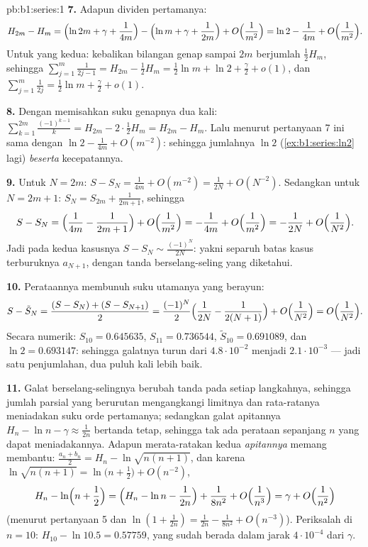 \begin{solution}{pb:b1:series:1}
\textbf{7.} Adapun dividen pertamanya:
\[
H_{2m} - H_m = \Bigl(\ln 2m + \gamma + \frac{1}{4m}\Bigr)
- \Bigl(\ln m + \gamma + \frac{1}{2m}\Bigr) +
O\Bigl(\frac{1}{m^2}\Bigr)
= \ln 2 - \frac{1}{4m} + O\Bigl(\frac{1}{m^2}\Bigr).
\]
Untuk yang kedua: kebalikan bilangan genap sampai $2m$ berjumlah $\frac12 H_m$, sehingga
$\sum_{j=1}^{m}\frac{1}{2j-1} = H_{2m} - \frac12 H_m = \frac12
\ln m + \ln 2 + \frac\gamma2 + o(1)$, dan $\sum_{j=1}^m
\frac{1}{2j} = \frac12\ln m + \frac\gamma2 + o(1)$.

\textbf{8.} Dengan memisahkan suku genapnya dua kali:
$\sum_{k=1}^{2m}\frac{(-1)^{k-1}}{k} = H_{2m} - 2\cdot\frac12
H_m = H_{2m} - H_m$. Lalu menurut pertanyaan 7 ini sama dengan $\ln 2 -
\frac{1}{4m} + O(m^{-2})$: sehingga jumlahnya $\ln 2$
(\cref{ex:b1:series:ln2} lagi) \emph{beserta} kecepatannya.

\textbf{9.} Untuk $N = 2m$: $S - S_N = \frac{1}{4m} + O(m^{-2}) =
\frac{1}{2N} + O(N^{-2})$. Sedangkan untuk $N = 2m + 1$: $S_{N} = S_{2m} +
\frac{1}{2m+1}$, sehingga
\[
S - S_N = \Bigl(\frac{1}{4m} - \frac{1}{2m+1}\Bigr) +
O\Bigl(\frac{1}{m^2}\Bigr)
= -\frac{1}{4m} + O\Bigl(\frac{1}{m^2}\Bigr)
= -\frac{1}{2N} + O\Bigl(\frac{1}{N^2}\Bigr).
\]
Jadi pada kedua kasusnya $S - S_N \sim \frac{(-1)^N}{2N}$: yakni separuh batas
kasus terburuknya $a_{N+1}$, dengan tanda berselang-seling yang diketahui.

\textbf{10.} Perataannya membunuh suku utamanya yang berayun:
\[
S - \tilde S_N = \frac{(S - S_N) + (S - S_{N+1})}{2}
= \frac{(-1)^N}{2}\Bigl(\frac{1}{2N} - \frac{1}{2(N+1)}\Bigr)
+ O\Bigl(\frac{1}{N^2}\Bigr) = O\Bigl(\frac{1}{N^2}\Bigr).
\]
Secara numerik: $S_{10} = 0.645635$, $S_{11} = 0.736544$, $\tilde
S_{10} = 0.691089$, dan $\ln 2 = 0.693147$: sehingga galatnya turun dari
$4.8\cdot10^{-2}$ menjadi $2.1\cdot10^{-3}$ --- jadi satu penjumlahan, dua puluh
kali lebih baik.

\textbf{11.} Galat berselang-selingnya berubah tanda pada setiap langkahnya,
sehingga jumlah parsial yang berurutan mengangkangi limitnya dan rata-ratanya
meniadakan suku orde pertamanya; sedangkan galat apitannya $H_n - \ln n -
\gamma \approx \frac{1}{2n}$ bertanda tetap, sehingga tak ada perataan
sepanjang $n$ yang dapat meniadakannya. Adapun merata-ratakan kedua \emph{apitannya} memang
membantu: $\frac{a_n + b_n}{2} = H_n - \ln\sqrt{n(n+1)}$, dan karena
$\ln\sqrt{n(n+1)} = \ln\bigl(n + \frac12\bigr) + O(n^{-2})$,
\[
H_n - \ln\Bigl(n + \frac12\Bigr)
= \Bigl(H_n - \ln n - \frac{1}{2n}\Bigr) + \frac{1}{8n^2} +
O\Bigl(\frac{1}{n^3}\Bigr) = \gamma + O\Bigl(\frac{1}{n^2}\Bigr)
\]
(menurut pertanyaan 5 dan $\ln(1 + \frac{1}{2n}) = \frac{1}{2n} -
\frac{1}{8n^2} + O(n^{-3})$). Periksalah di $n = 10$: $H_{10} -
\ln 10.5 = 0.57759$, yang sudah berada dalam jarak $4\cdot10^{-4}$ dari
$\gamma$.


\end{solution}
